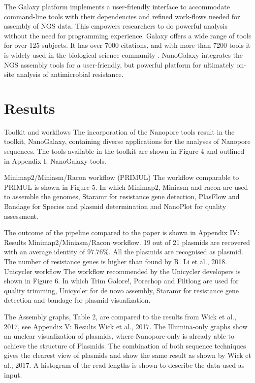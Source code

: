 \documentclass[a4paper,num-refs]{oup-contemporary}
\begin{document}
The Galaxy platform implements a user-friendly interface to accommodate command-line tools with their dependencies and refined work-flows needed for assembly of NGS data. This empowers researchers to do powerful analysis without the need for programming experience. Galaxy offers a wide range of tools for over 125 subjects. It has over 7000 citations, and with more than 7200 tools it is widely used in the biological science community \cite{galaxycitations, galaxytoolshed}. NanoGalaxy integrates the NGS assembly tools for a user-friendly, but powerful platform for ultimately on-site analysis of antimicrobial resistance.


\section{Results}
Toolkit and workflows
The incorporation of the Nanopore tools result in the toolkit, NanoGalaxy, containing diverse
applications for the analyses of Nanopore sequences. The tools available in the toolkit are shown in
Figure 4 and outlined in Appendix I: NanoGalaxy tools.

Minimap2/Miniasm/Racon workflow (PRIMUL)
The workflow comparable to PRIMUL is shown in Figure 5. In which Minimap2, Miniasm and racon
are used to assemble the genomes, Staramr for resistance gene detection, PlasFlow and Bandage for
Species and plasmid determination and NanoPlot for quality assessment.

The outcome of the pipeline compared to the paper is shown in Appendix IV: Results
Minimap2/Miniasm/Racon workflow. 19 out of 21 plasmids are recovered with an average identity
of 97.76\%. All the plasmids are recognised as plasmid. The number of resistance genes is higher than
found by R. Li et al., 2018.
Unicycler workflow
The workflow recommended by the Unicycler developers is shown in Figure 6. In which Trim Galore!,
Porechop and Filtlong are used for quality trimming, Unicycler for de novo assembly, Staramr for
resistance gene detection and bandage for plasmid visualization.

The Assembly graphs, Table 2, are compared to the results from Wick et al., 2017, see Appendix V:
Results Wick et al., 2017. The Illumina-only graphs show an unclear visualization of plasmids, where
Nanopore-only is already able to achieve the structure of Plasmids. The combination of both
sequence techniques gives the clearest view of plasmids and show the same result as shown by Wick
et al., 2017. A histogram of the read lengths is shown to describe the data used as input.
\end{document}
